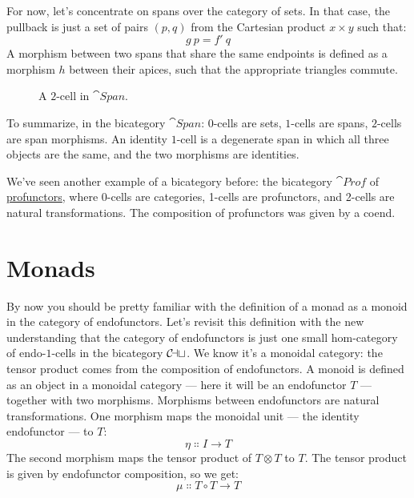\noindent
For now, let's concentrate on spans over the category of sets. In that
case, the pullback is just a set of pairs $(p, q)$ from the
Cartesian product $x \times y$ such that:
\[g\ p = f'\ q\]
A morphism between two spans that share the same endpoints is defined as
a morphism $h$ between their apices, such that the appropriate
triangles commute.

\begin{figure}[H]
\centering
{}
\caption{A $2$-cell in $\cat{Span}$.}
\end{figure}

\noindent
To summarize, in the bicategory $\cat{Span}$: $0$-cells are sets, $1$-cells
are spans, $2$-cells are span morphisms. An identity $1$-cell is a
degenerate span in which all three objects are the same, and the two
morphisms are identities.

We've seen another example of a bicategory before: the bicategory
$\cat{Prof}$ of
\hyperref[ends-and-coends]{profunctors},
where 0-cells are categories, 1-cells are profunctors, and 2-cells are
natural transformations. The composition of profunctors was given by a
coend.

\section{Monads}

By now you should be pretty familiar with the definition of a monad as a
monoid in the category of endofunctors. Let's revisit this definition
with the new understanding that the category of endofunctors is just one
small hom-category of endo-$1$-cells in the bicategory $\mathcal{C\mkern-3mu at}$. We
know it's a monoidal category: the tensor product comes from the
composition of endofunctors. A monoid is defined as an object in a
monoidal category --- here it will be an endofunctor $T$ ---
together with two morphisms. Morphisms between endofunctors are natural
transformations. One morphism maps the monoidal unit --- the identity
endofunctor --- to $T$:
\[\eta \Colon I \to T\]
The second morphism maps the tensor product of $T \otimes T$ to
$T$. The tensor product is given by endofunctor composition, so
we get:
\[\mu \Colon T \circ T \to T\]


